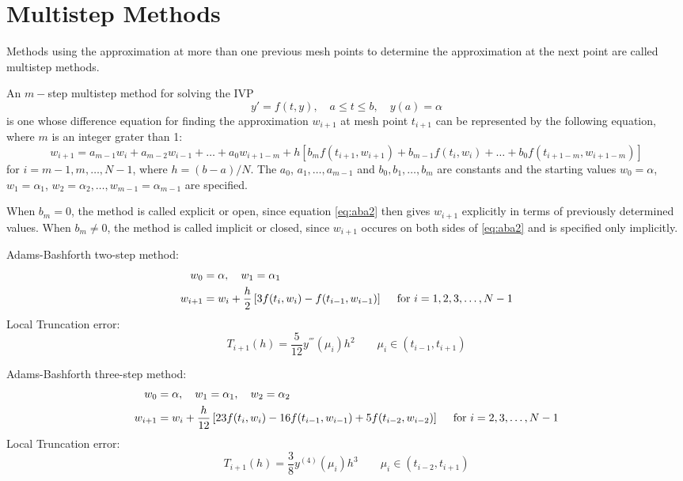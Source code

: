 \documentclass[../main-sheet.tex]{subfiles}
\begin{document}
\chapter{Multistep Methods}
Methods using the approximation at more than one previous mesh points to determine the approximation at the next point are called multistep methods.
\begin{defn}
    An \(m-\)step multistep method for solving the IVP
    \begin{equation}
        y'=f(t,y),\quad a\leq t\leq b,\quad y(a)=\alpha\label{eq:aba1}
    \end{equation}
    is one whose difference equation for finding the approximation \(w_{i+1}\) at mesh point \(t_{i+1}\) can be represented by the following equation, where \(m\) is an integer grater than 1:
    \begin{equation}
        w_{i+1}=a_{m-1}w_i+a_{m-2}w_{i-1}+\dots+a_0w_{i+1-m}+h[b_mf(t_{i+1},w_{i+1})+b_{m-1}f(t_i,w_i)+\dots+b_0f(t_{i+1-m},w_{i+1-m})]\label{eq:aba2}
    \end{equation}
    for \(i=m-1,m,\dots,N-1\), where \(h=(b-a)/N\). The \(a_0\), \(a_1,\dots,a_{m-1}\) and \(b_0,b_1,\dots,b_m\) are constants and the starting values \(w_0=\alpha\), \(w_1=\alpha_1\), \(w_2=\alpha_2,\dots,w_{m-1}=\alpha_{m-1}\) are specified.
\end{defn}
When \(b_m=0\), the method is called explicit or open, since equation \eqref{eq:aba2} then gives \(w_{i+1}\) explicitly in terms of previously determined values. When \(b_m\neq0\), the method is called implicit or closed, since \(w_{i+1}\) occures on both sides of \eqref{eq:aba2} and is specified only implicitly.

Adams-Bashforth two-step method:
\begin{align}
    w_0&=\alpha, \quad w_1=\alpha_1\notag\\
    w_{i+1}&=w_i+\frac{h}{2}\left[ 3f(t_i,w_i)-f(t_{i-1},w_{i-1})\right]\quad\text{ for } i=1,2,3,\dots, N-1 \label{eq:aba3}
\end{align}
Local Truncation error:
\[T_{i+1}(h)=\frac{5}{12}y^{'''}(\mu_i)h^2\qquad \mu_i\in (t_{i-1},t_{i+1})\]


Adams-Bashforth three-step method:
\begin{align}
    w_0&=\alpha, \quad w_1=\alpha_1,\quad w_2=\alpha_2\notag\\
    w_{i+1}&=w_i+\frac{h}{12}\left[ 23f(t_i,w_i)-16f(t_{i-1},w_{i-1})+5f(t_{i-2},w_{i-2}) \right]\quad\text{ for } i=2,3,\dots, N-1\label{eq:aba4}
\end{align}
Local Truncation error:
\[T_{i+1}(h)=\frac{3}{8}y^{(4)}(\mu_i)h^3\qquad \mu_i\in (t_{i-2},t_{i+1})\]
\end{document}
